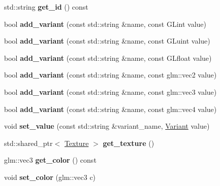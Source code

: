 \begin{DoxyCompactItemize}
std\+::string {\bfseries get\+\_\+id} () const
\item 
\mbox{\label{classexample_1_1_material_ae85fe9358d9f308fafc76019db0d7b49}} 
bool {\bfseries add\+\_\+variant} (const std\+::string \&name, const G\+Lint value)
\item 
\mbox{\label{classexample_1_1_material_aa98aabeebad148347dde0543a3e42e19}} 
bool {\bfseries add\+\_\+variant} (const std\+::string \&name, const G\+Luint value)
\item 
\mbox{\label{classexample_1_1_material_a0fb8216054d99abeb272d46363d4de69}} 
bool {\bfseries add\+\_\+variant} (const std\+::string \&name, const G\+Lfloat value)
\item 
\mbox{\label{classexample_1_1_material_a5567665d0ea2f7bc1be205ab1ba808e2}} 
bool {\bfseries add\+\_\+variant} (const std\+::string \&name, const glm\+::vec2 value)
\item 
\mbox{\label{classexample_1_1_material_a47d5755e9892c7df08e123f840cda0ac}} 
bool {\bfseries add\+\_\+variant} (const std\+::string \&name, const glm\+::vec3 value)
\item 
\mbox{\label{classexample_1_1_material_a89dcedf45417beade3637f1f1724c13b}} 
bool {\bfseries add\+\_\+variant} (const std\+::string \&name, const glm\+::vec4 value)
\item 
\mbox{\label{classexample_1_1_material_ad609a4e2fecd256f829f271d05a4f8c7}} 
void {\bfseries set\+\_\+value} (const std\+::string \&variant\+\_\+name, \mbox{\hyperlink{structexample_1_1_variant}{Variant}} value)
\item 
\mbox{\label{classexample_1_1_material_aeee88c136da1811f469dab5573bec1d2}} 
std\+::shared\+\_\+ptr$<$ \mbox{\hyperlink{classexample_1_1_texture}{Texture}} $>$ {\bfseries get\+\_\+texture} ()
\item 
\mbox{\label{classexample_1_1_material_ad404cd0e0d35c10d0d1d98b464a05037}} 
glm\+::vec3 {\bfseries get\+\_\+color} () const
\item 
\mbox{\label{classexample_1_1_material_a52f71468aca3d0ed96c730189f77a9fb}} 
void {\bfseries set\+\_\+color} (glm\+::vec3 c)
\end{DoxyCompactItemize}
